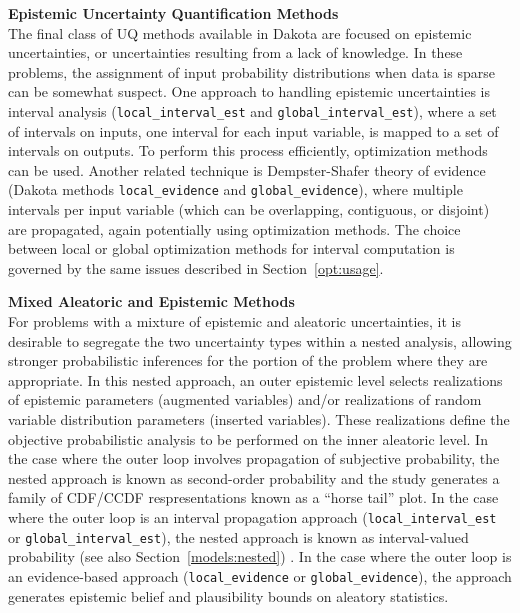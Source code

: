 {\bf Epistemic Uncertainty Quantification Methods} \\
The final class of UQ methods available in Dakota are focused on
epistemic uncertainties, or uncertainties resulting from a lack of
knowledge. In these problems, the assignment of input probability
distributions when data is sparse can be somewhat suspect. One
approach to handling epistemic uncertainties is interval analysis
(\texttt{local\_interval\_est} and \texttt{global\_interval\_est}),
where a set of intervals on inputs, one interval for each input
variable, is mapped to a set of intervals on outputs.  To perform this
process efficiently, optimization methods can be used.  Another
related technique is Dempster-Shafer theory of evidence (Dakota
methods \texttt{local\_evidence} and \texttt{global\_evidence}), where
multiple intervals per input variable (which can be overlapping,
contiguous, or disjoint) are propagated, again potentially using
optimization methods.  The choice between local or global optimization
methods for interval computation is governed by the same issues
described in Section~\ref{opt:usage}.

{\bf Mixed Aleatoric and Epistemic Methods} \\
For problems with a mixture of epistemic and aleatoric uncertainties,
it is desirable to segregate the two uncertainty types within a nested
analysis, allowing stronger probabilistic inferences for the portion
of the problem where they are appropriate. In this nested approach, an
outer epistemic level selects realizations of epistemic parameters
(augmented variables) and/or realizations of random variable
distribution parameters (inserted variables). These realizations
define the objective probabilistic analysis to be performed on the
inner aleatoric level. In the case where the outer loop involves
propagation of subjective probability, the nested approach is known as
second-order probability and the study generates a family of CDF/CCDF
respresentations known as a ``horse tail'' plot.  In the case where
the outer loop is an interval propagation approach
(\texttt{local\_interval\_est} or \texttt{global\_interval\_est}), the
nested approach is known as interval-valued probability (see also
Section~\ref{models:nested}) . In the case where the outer loop is an
evidence-based approach (\texttt{local\_evidence} or
\texttt{global\_evidence}), the approach generates epistemic belief
and plausibility bounds on aleatory statistics.


